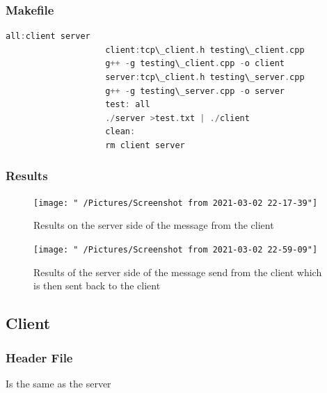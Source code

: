 \documentclass[11pt]{article}
\begin{document}
			\subsubsection{Makefile}
				\begin{lstlisting}[language=C++]
					all:client server
					client:tcp\_client.h testing\_client.cpp
					g++ -g testing\_client.cpp -o client
					server:tcp\_client.h testing\_server.cpp
					g++ -g testing\_server.cpp -o server
					test: all
					./server >test.txt | ./client
					clean:
					rm client server
				\end{lstlisting}
			\subsubsection{Results}
				\begin{figure}[H]
					\centering
					\texttt{[image: "~/Pictures/Screenshot from 2021-03-02 22-17-39"]}
					\caption{Results on the server side of the message from the client}
					\label{fig:screenshot-from-2021-03-02-22-17-39}
				\end{figure}
				\begin{figure}[H]
					\centering
					\texttt{[image: "~/Pictures/Screenshot from 2021-03-02 22-59-09"]}
					\caption{Results of the server side of the message send from the client which is then sent back to the client }
					\label{fig:screenshot-from-2021-03-02-22-59-09}
				\end{figure}	
		\subsection{Client}
			\subsubsection{Header File}
				Is the same as the server
\end{document}

